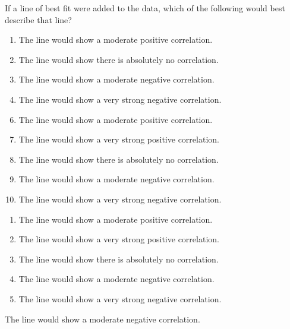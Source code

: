 If a line of best fit were added to the data, which of the following would best describe that line?


\ifsat
	\begin{enumerate}[label=\Alph*)]
		\item The line would show a moderate positive correlation.
		\item The line would show there is absolutely no correlation.
		\item The line would show a moderate negative correlation. %
		\item The line would show a very strong negative correlation.
	\end{enumerate}
\else
\fi

\ifacteven
	\begin{enumerate}[label=\textbf{\Alph*.},itemsep=\fill,align=left]
		\setcounter{enumii}{5}
		\item The line would show a moderate positive correlation.
		\item The line would show a very strong positive correlation.
		\item The line would show there is absolutely no correlation.
		\addtocounter{enumii}{1}
		\item The line would show a moderate negative correlation. %
		\item The line would show a very strong negative correlation.
	\end{enumerate}
\else
\fi

\ifactodd
	\begin{enumerate}[label=\textbf{\Alph*.},itemsep=\fill,align=left]
		\item The line would show a moderate positive correlation.
		\item The line would show a very strong positive correlation.
		\item The line would show there is absolutely no correlation.
		\item The line would show a moderate negative correlation. %
		\item The line would show a very strong negative correlation.
	\end{enumerate}
\else
\fi

\ifgridin
 The line would show a moderate negative correlation. %
		
\else
\fi

